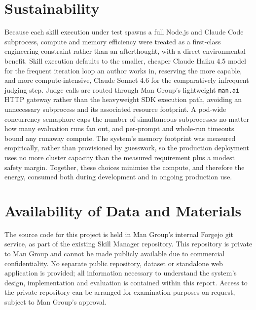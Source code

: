 
\section*{Sustainability}
Because each skill execution under test spawns a full Node.js and Claude Code
subprocess, compute and memory efficiency were treated as a first-class
engineering constraint rather than an afterthought, with a direct environmental
benefit. Skill execution defaults to the smaller, cheaper Claude Haiku 4.5 model
for the frequent iteration loop an author works in, reserving the more capable,
and more compute-intensive, Claude Sonnet 4.6 for the comparatively infrequent
judging step. Judge calls are routed through Man Group's lightweight
\texttt{man.ai} HTTP gateway rather than the heavyweight SDK execution path,
avoiding an unnecessary subprocess and its associated resource footprint. A
pod-wide concurrency semaphore caps the number of simultaneous subprocesses no
matter how many evaluation runs fan out, and per-prompt and whole-run timeouts
bound any runaway compute. The system's memory footprint was measured
empirically, rather than provisioned by guesswork, so the production deployment
uses no more cluster capacity than the measured requirement plus a modest safety
margin. Together, these choices minimise the compute, and therefore the energy,
consumed both during development and in ongoing production use.

\section*{Availability of Data and Materials}
The source code for this project is held in Man Group's internal Forgejo git
service, as part of the existing Skill Manager repository. This repository is
private to Man Group and cannot be made publicly available due to commercial
confidentiality. No separate public repository, dataset or standalone web
application is provided; all information necessary to understand the system's
design, implementation and evaluation is contained within this report. Access to
the private repository can be arranged for examination purposes on request,
subject to Man Group's approval.

